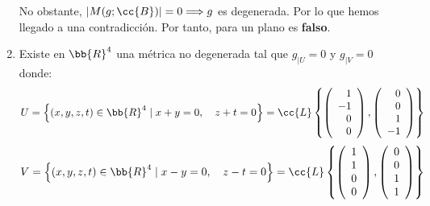 \begin{ejercicio}
\begin{enumerate}
        No obstante, $|M(g;\cc{B})| = 0 \Longrightarrow g$ es degenerada. Por lo que hemos llegado a una contradicción. Por tanto, para un plano es \textbf{falso}.

        \item Existe en $\bb{R}^4$ una métrica no degenerada tal que $g_{\left|U\right.}=0$ y $g_{\left|V\right.}=0$ donde:
        \begin{equation*}
            U=\left\{(x,y,z,t)\in \bb{R}^4 \mid x+y=0, \quad z+t=0 \right\} = \cc{L} \left\{
            \left(\begin{array}{r}
                 1 \\ -1 \\ 0 \\ 0
            \end{array} \right),
            \left(\begin{array}{r}
                  0 \\ 0 \\ 1 \\ -1
            \end{array} \right)
            \right\}
        \end{equation*}
        \begin{equation*}
            V=\left\{(x,y,z,t)\in \bb{R}^4 \mid x-y=0, \quad z-t=0 \right\} = \cc{L} \left\{
            \left(\begin{array}{r}
                 1 \\ 1 \\ 0 \\ 0
            \end{array} \right),
            \left(\begin{array}{r}
                  0 \\ 0 \\ 1 \\ 1
            \end{array} \right)
            \right\}
        \end{equation*}


\end{enumerate}
\end{ejercicio}
